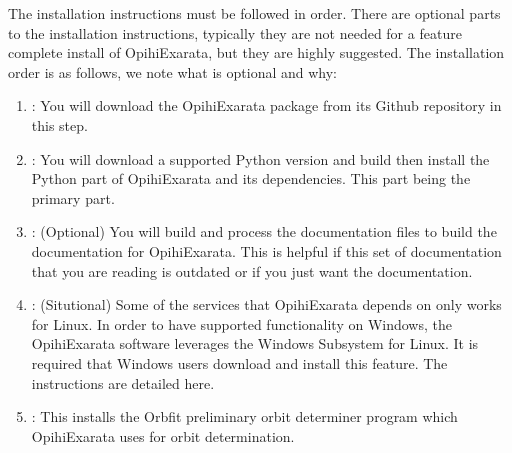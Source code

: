 \documentclass[letterpaper,11pt,english]{sphinxmanual}
\begin{document}
\sphinxAtStartPar
The installation instructions must be followed in order. There are optional
parts to the installation instructions, typically they are not needed for a
feature complete install of OpihiExarata, but they are highly suggested. The
installation order is as follows, we note what is optional and why:
\begin{enumerate}
%
\item {} 
\sphinxAtStartPar
{\hyperref[\detokenize{technical/installation/download:technical-installation-download}]{}}: You will download the OpihiExarata package from its Github repository in this step.

\item {} 
\sphinxAtStartPar
{\hyperref[\detokenize{technical/installation/python:technical-installation-python-part}]{}}: You will download a supported Python version and build then install the Python part of OpihiExarata and its dependencies. This part being the primary part.

\item {} 
\sphinxAtStartPar
{\hyperref[\detokenize{technical/installation/documentation:technical-installation-documentation}]{}}: (Optional) You will build and process the documentation files to build the documentation for OpihiExarata. This is helpful if this set of documentation that you are reading is outdated or if you just want the documentation.

\item {} 
\sphinxAtStartPar
{\hyperref[\detokenize{technical/installation/windows:technical-installation-windows-compatibility}]{}}: (Situtional) Some of the services that OpihiExarata depends on only works for Linux. In order to have supported functionality on Windows, the OpihiExarata software leverages the Windows Subsystem for Linux. It is required that Windows users download and install this feature. The instructions are detailed here.

\item {} 
\sphinxAtStartPar
{\hyperref[\detokenize{technical/installation/orbfit:technical-installation-orbfit}]{}}: This installs the Orbfit preliminary orbit determiner program which OpihiExarata uses for orbit determination.

\end{enumerate}
\end{document}
